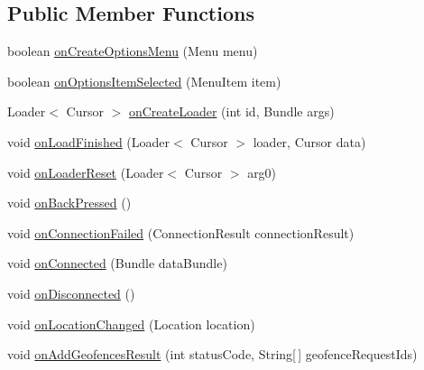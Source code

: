 \subsection*{Public Member Functions}
\begin{DoxyCompactItemize}
\item 
boolean \hyperlink{classuk_1_1ac_1_1swan_1_1digitaltrails_1_1activities_1_1_map_activity_a7b66e700cab5b974365c447fb367765a}{on\+Create\+Options\+Menu} (Menu menu)
\item 
boolean \hyperlink{classuk_1_1ac_1_1swan_1_1digitaltrails_1_1activities_1_1_map_activity_a025f8bf6d684de3fcaaa95e876c986db}{on\+Options\+Item\+Selected} (Menu\+Item item)
\item 
Loader$<$ Cursor $>$ \hyperlink{classuk_1_1ac_1_1swan_1_1digitaltrails_1_1activities_1_1_map_activity_a434830a430be39dccbcf01ad3bf18592}{on\+Create\+Loader} (int id, Bundle args)
\item 
void \hyperlink{classuk_1_1ac_1_1swan_1_1digitaltrails_1_1activities_1_1_map_activity_a96b98cee919b154d54f5f74691a3dfd4}{on\+Load\+Finished} (Loader$<$ Cursor $>$ loader, Cursor data)
\item 
void \hyperlink{classuk_1_1ac_1_1swan_1_1digitaltrails_1_1activities_1_1_map_activity_a970e6bbc7d08e4b34969e00009b514be}{on\+Loader\+Reset} (Loader$<$ Cursor $>$ arg0)
\item 
void \hyperlink{classuk_1_1ac_1_1swan_1_1digitaltrails_1_1activities_1_1_map_activity_abb991902396fdc60eb4a3f6fad8b1dc8}{on\+Back\+Pressed} ()
\item 
void \hyperlink{classuk_1_1ac_1_1swan_1_1digitaltrails_1_1activities_1_1_map_activity_a7d0b0bf6dbf9f32f89ea8a4fdd5813fd}{on\+Connection\+Failed} (Connection\+Result connection\+Result)
\item 
void \hyperlink{classuk_1_1ac_1_1swan_1_1digitaltrails_1_1activities_1_1_map_activity_acb8f0cc22fecf4140525eb3f93c8bca1}{on\+Connected} (Bundle data\+Bundle)
\item 
void \hyperlink{classuk_1_1ac_1_1swan_1_1digitaltrails_1_1activities_1_1_map_activity_ac40ceb283c44ad9e74f9e10824e76257}{on\+Disconnected} ()
\item 
void \hyperlink{classuk_1_1ac_1_1swan_1_1digitaltrails_1_1activities_1_1_map_activity_a05b9ef126f8ccc027b7f1922b6966ca0}{on\+Location\+Changed} (Location location)
\item 
void \hyperlink{classuk_1_1ac_1_1swan_1_1digitaltrails_1_1activities_1_1_map_activity_afeff948328c53e9ad80e19a7ef5bbb56}{on\+Add\+Geofences\+Result} (int status\+Code, String\mbox{[}$\,$\mbox{]} geofence\+Request\+Ids)
\end{DoxyCompactItemize}
